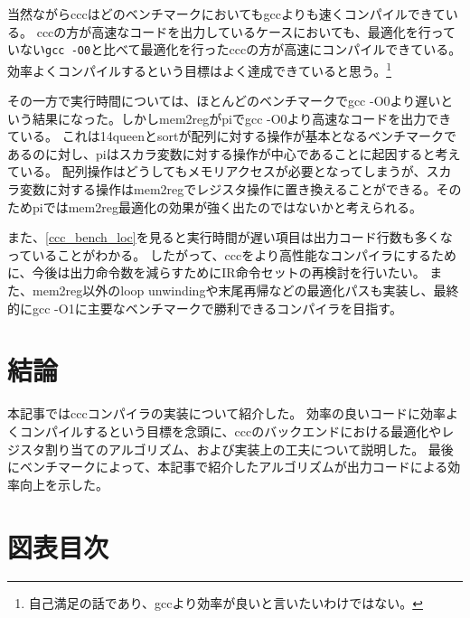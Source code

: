 \documentclass[uplatex,a4paper]{jsarticle}
\begin{document}
当然ながらcccはどのベンチマークにおいてもgccよりも速くコンパイルできている。
cccの方が高速なコードを出力しているケースにおいても、最適化を行っていない\texttt{gcc -O0}と比べて最適化を行ったcccの方が高速にコンパイルできている。
効率よくコンパイルするという目標はよく達成できていると思う。\footnote{自己満足の話であり、gccより効率が良いと言いたいわけではない。}

その一方で実行時間については、ほとんどのベンチマークでgcc -O0より遅いという結果になった。しかしmem2regがpiでgcc -O0より高速なコードを出力できている。
これは14queenとsortが配列に対する操作が基本となるベンチマークであるのに対し、piはスカラ変数に対する操作が中心であることに起因すると考えている。
配列操作はどうしてもメモリアクセスが必要となってしまうが、スカラ変数に対する操作はmem2regでレジスタ操作に置き換えることができる。そのためpiではmem2reg最適化の効果が強く出たのではないかと考えられる。

また、\cref{ccc_bench_loc}を見ると実行時間が遅い項目は出力コード行数も多くなっていることがわかる。
したがって、cccをより高性能なコンパイラにするために、今後は出力命令数を減らすためにIR命令セットの再検討を行いたい。
また、mem2reg以外のloop unwindingや末尾再帰などの最適化パスも実装し、最終的にgcc -O1に主要なベンチマークで勝利できるコンパイラを目指す。

\section{結論}

本記事ではcccコンパイラの実装について紹介した。
効率の良いコードに効率よくコンパイルするという目標を念頭に、cccのバックエンドにおける最適化やレジスタ割り当てのアルゴリズム、および実装上の工夫について説明した。
最後にベンチマークによって、本記事で紹介したアルゴリズムが出力コードによる効率向上を示した。

\clearpage
\appendix

\section{図表目次}
\listoffigures
\listofalgorithms
\listoftables



\end{document}
